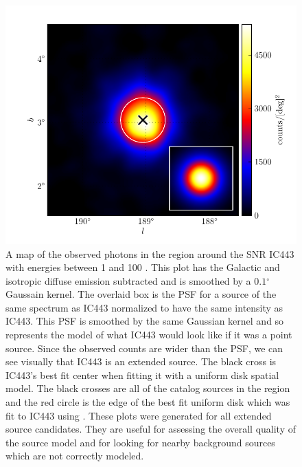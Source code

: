 \documentclass[12pt,preprint]{aastex}
\newcommand{\gev}{\text{GeV}\xspace}
\renewcommand{\deg}{\ensuremath{^\circ}\xspace}
\newcommand{\pointlike}{\text{\em pointlike}\xspace}
\begin{document}
\clearpage
\begin{figure}
  \begin{center}
    \includegraphics{ic443_plots/ic443_smoothed_counts.pdf}
    \caption{A map of the observed photons in the region around the SNR
    IC443 with energies between 1 \gev and 100 \gev.  This plot has the
    Galactic and isotropic diffuse emission subtracted and is smoothed
    by a $0.1\deg$ Gaussain kernel.  The overlaid box is the PSF for
    a source of the same spectrum as IC443 normalized to have the same
    intensity as IC443.  This PSF is smoothed by the same Gaussian kernel
    and so represents the model of what IC443 would look like if it was
    a point source. Since the observed counts are wider than the PSF,
    we can see visually that IC443 is an extended source.  The black
    cross is IC443's best fit center when fitting it with a uniform
    disk spatial model. The
    black crosses are all of the catalog sources in
    the region and the red circle is the edge of the best fit
    uniform disk which was fit to IC443 using \pointlike.  These plots
    were generated for all extended source candidates.  They are useful
    for assessing the overall quality of the source model and for looking
    for nearby background sources which are not correctly modeled.}
    \label{smoothed_counts}
  \end{center}
\end{figure}
\end{document}
